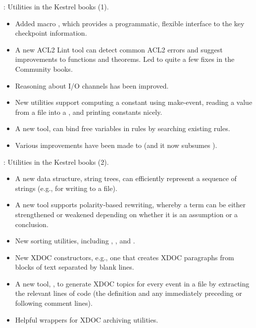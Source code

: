 
\begin{frame}

\implibtitle

:
Utilities in the Kestrel books (1).
\begin{itemize}
\item Added macro ,
  which provides a programmatic, flexible interface
  to the key checkpoint information.
\item A new ACL2 Lint tool can detect common ACL2 errors and suggest
  improvements to functions and theorems.  Led to quite
  a few fixes in the Community books.
\item Reasoning about I/O channels has been improved.
\item New utilities support computing a constant using make-event,
  reading a value from a file into a , and printing constants
  nicely.
\item A new tool,  can bind free variables in rules by
  searching existing rules.
\item Various improvements have been made to  (and it now
  subsumes ).
\end{itemize}

\end{frame}


\begin{frame}

\implibtitle

:
Utilities in the Kestrel books (2).
\begin{itemize}
\item A new data structure, string trees, can efficiently represent a
  sequence of strings (e.g., for writing to a file).
\item A new tool supports polarity-based rewriting, whereby a term can
  be either strengthened or weakened depending on whether it is an
  assumption or a conclusion.
\item New sorting utilities, including ,
  , and .
\item New XDOC constructors, e.g., one that creates XDOC paragraphs
  from blocks of text separated by blank lines.
\item A new tool, , to generate XDOC topics
  for every event in a file by extracting the relevant lines of code
  (the definition and any immediately preceding or following comment
  lines).
\item Helpful wrappers for XDOC archiving utilities.
\end{itemize}

\end{frame}

